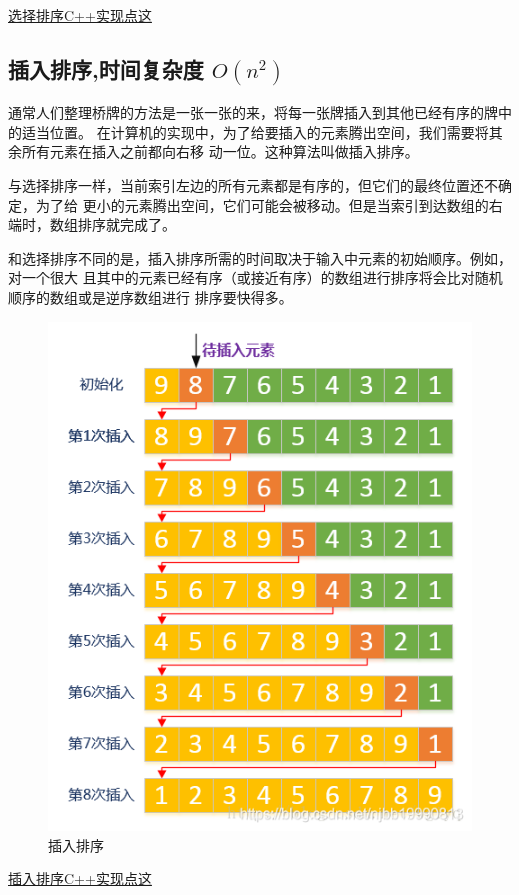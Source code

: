 \documentclass[12pt,a4paper,onecolumn]{article}
\begin{document}
	\hyperref{https://github.com/la1993628/Algorithm_study/blob/master/%
	\subsection{插入排序,时间复杂度 $O(n^2)$}
	通常人们整理桥牌的方法是一张一张的来，将每一张牌插入到其他已经有序的牌中的适当位置。
	在计算机的实现中，为了给要插入的元素腾出空间，我们需要将其余所有元素在插入之前都向右移
	动一位。这种算法叫做插入排序。
	
	与选择排序一样，当前索引左边的所有元素都是有序的，但它们的最终位置还不确定，为了给
	更小的元素腾出空间，它们可能会被移动。但是当索引到达数组的右端时，数组排序就完成了。
	
	和选择排序不同的是，插入排序所需的时间取决于输入中元素的初始顺序。例如，对一个很大
	且其中的元素已经有序（或接近有序）的数组进行排序将会比对随机顺序的数组或是逆序数组进行
	排序要快得多。
	\begin{figure}[ht]
		\centering
		\includegraphics[width=0.7\linewidth]{img/insertSort}
		\caption{插入排序}
		\label{fig:insertsort}
	\end{figure}
\hyperref{https://github.com/la1993628/Algorithm_study/blob/master/%
	
	
\end{document}
